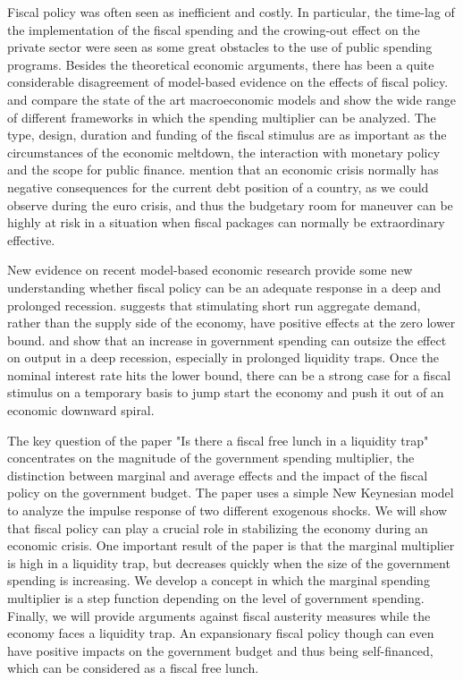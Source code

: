 \documentclass[12pt,a4paper,oneside,titlepage]{article}
\begin{document}
Fiscal policy was often seen as inefficient and costly. In particular, the time-lag of the implementation of the fiscal spending and the crowing-out effect on the private sector were seen as some great obstacles to the use of public spending programs. Besides the theoretical economic arguments, there has been a quite considerable disagreement of model-based evidence on the effects of fiscal policy. \citet{CoenenG..2010} and \citet{Afonso.2010} compare the state of the art macroeconomic models and show the wide range of different frameworks in which the spending multiplier can be analyzed. The type, design, duration and funding of the fiscal stimulus are as important as the circumstances of the economic meltdown, the interaction with monetary policy and the scope for public finance. \citet{Coenen.2010} mention that an economic crisis normally has negative consequences for the current debt position of a country, as we could observe during the euro crisis, and thus the budgetary room for maneuver can be highly at risk in a situation when fiscal packages can normally be extraordinary effective. 
\par
\bigskip
New evidence on recent model-based economic research provide some new understanding whether fiscal policy can be an adequate response in a deep and prolonged recession. \citet{Eggertsson.2011} suggests that stimulating short run aggregate demand, rather than the supply side of the economy, have positive effects at the zero lower bound. \citep{Davig.2009} and \citet{Christiano.2011} show that an increase in government spending can outsize the effect on output in a deep recession, especially in prolonged liquidity traps. Once the nominal interest rate hits the lower bound, there can be a strong case for a fiscal stimulus on a temporary basis to jump start the economy and push it out of an economic downward spiral.
\par
\bigskip
The key question of the paper "Is there a fiscal free lunch in a liquidity trap" concentrates on the magnitude of the government spending multiplier, the distinction between marginal and average effects and the impact of the fiscal policy on the government budget.
The paper uses a simple New Keynesian model to analyze the impulse response of two different exogenous shocks. We will show that fiscal policy can play a crucial role in stabilizing the economy during an economic crisis. One important result of the paper is that the marginal multiplier is high in a liquidity trap, but decreases quickly when the size of the government spending is increasing. 
We develop a concept in which the marginal spending multiplier is a step function depending on the level of government spending.
Finally, we will provide arguments against fiscal austerity measures while the economy faces a liquidity trap. An expansionary fiscal policy though can even have positive impacts on the government budget and thus being self-financed, which can be considered as a fiscal free lunch.
\end{document}
